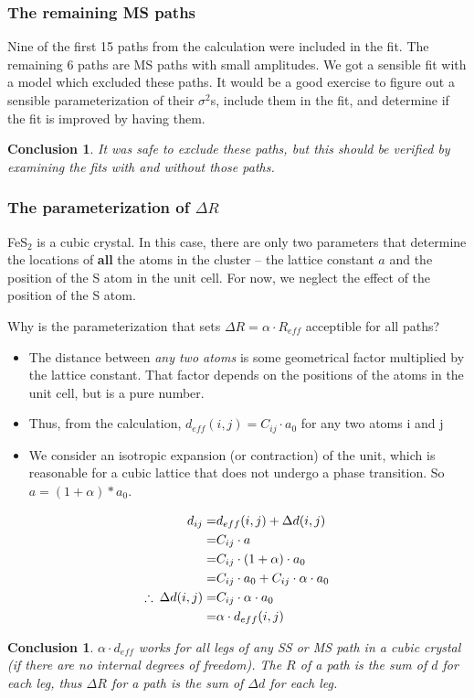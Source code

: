 \documentclass[10pt, xcolor=x11names, compress, handout]{beamer}
\newcommand{\fes}{FeS$_2$}
\newtheorem{conclusion}[theorem]{Conclusion}
\begin{document}
\begin{frame}
  \frametitle{The remaining MS paths}
  Nine of the first 15 paths from the {\feff} calculation were
  included in the fit.  The remaining 6 paths are MS paths with small
  amplitudes.  We got a sensible fit with a model which excluded these
  paths.  It would be a good exercise to figure out a sensible
  parameterization of their $\sigma^2$s, include them in the fit, and
  determine if the fit is improved by having them.

  \begin{conclusion}
    It was safe to exclude these paths, but this should be verified by
    examining the fits with and without those paths.
  \end{conclusion}
\end{frame}

\begin{frame}
  \frametitle{The parameterization of $\Delta R$}
  \footnotesize%
  {\fes} is a cubic crystal.  In this case, there are only two
  parameters that determine the locations of \textbf{all} the atoms in
  the cluster -- the lattice constant $a$ and the position of the S
  atom in the unit cell.  For now, we neglect the effect of  the
  position of the S atom.

  \medskip

  Why is the parameterization that sets $\Delta R=\alpha\cdot R_{eff}$
  acceptible for all paths?

  \begin{itemize}
    \footnotesize%
  \item The distance between \textit{any two atoms} is some
    geometrical factor multiplied by the lattice constant.  That
    factor depends on the positions of the atoms in the unit cell, but
    is a pure number.
  \item Thus, from the {\feff} calculation, $d_{eff}(i,j) =
    C_{ij}\cdot a_0$ for any two atoms i and j
  \item We consider an isotropic expansion (or contraction) of the
    unit, which is reasonable for a cubic lattice that does not
    undergo a phase transition.  So $a=(1+\alpha)*a_0$.
  \end{itemize}
  \begin{align}
    d_{ij} =& d_{eff}(i,j) + \Delta d(i,j)\notag\\
    =& C_{ij} \cdot a \notag\\
    =& C_{ij} \cdot (1+\alpha)\cdot a_0 \notag\\
    =& C_{ij}\cdot a_0 + C_{ij}\cdot \alpha\cdot a_0\notag\\
    \therefore \> \Delta d(i,j) =& C_{ij}\cdot \alpha\cdot a_0\notag\\
    =& \alpha\cdot d_{eff}(i,j)\notag
  \end{align}
  \begin{conclusion}
    $\alpha\cdot d_{eff}$ works for all legs of any SS or MS path in a
    cubic crystal (if there are no internal degrees of freedom). The
    $R$ of a path is the sum of $d$ for each leg, thus $\Delta R$ for
    a path is the sum of $\Delta d$ for each leg.
  \end{conclusion}
\end{frame}
\end{document}
